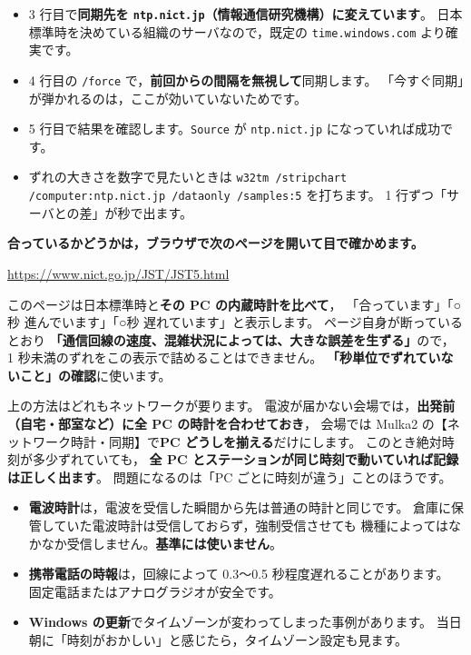 \begin{itemize}
\item 3 行目で\textbf{同期先を \texttt{ntp.nict.jp}（情報通信研究機構）に変えています}。
      日本標準時を決めている組織のサーバなので，既定の \texttt{time.windows.com} より確実です。
\item 4 行目の \texttt{/force} で，\textbf{前回からの間隔を無視して}同期します。
      「今すぐ同期」が弾かれるのは，ここが効いていないためです。
\item 5 行目で結果を確認します。\texttt{Source} が \texttt{ntp.nict.jp} になっていれば成功です。
\item ずれの大きさを数字で見たいときは
      \texttt{w32tm /stripchart /computer:ntp.nict.jp /dataonly /samples:5} を打ちます。
      1 行ずつ「サーバとの差」が秒で出ます。
\end{itemize}

\textbf{合っているかどうかは，ブラウザで次のページを開いて目で確かめます。}

\begin{center}
\small\url{https://www.nict.go.jp/JST/JST5.html}
\end{center}

このページは日本標準時と\textbf{その PC の内蔵時計を比べて}，
「合っています」「○秒 進んでいます」「○秒 遅れています」と表示します。
ページ自身が断っているとおり
\textbf{「通信回線の速度、混雑状況によっては、大きな誤差を生ずる」}ので，
1 秒未満のずれをこの表示で詰めることはできません。
\textbf{「秒単位でずれていないこと」の確認}に使います。

\begin{Note}[会場でインターネットにつながらない場合]
上の方法はどれもネットワークが要ります。
電波が届かない会場では，\textbf{出発前（自宅・部室など）に全 PC の時計を合わせておき}，
会場では Mulka2 の【ネットワーク時計・同期】で\textbf{PC どうしを揃える}だけにします。
このとき絶対時刻が多少ずれていても，
\textbf{全 PC とステーションが同じ時刻で動いていれば記録は正しく出ます}。
問題になるのは「PC ごとに時刻が違う」ことのほうです。
\end{Note}

\begin{Note}
\begin{itemize}
\item \textbf{電波時計}は，電波を受信した瞬間から先は普通の時計と同じです。
      倉庫に保管していた電波時計は受信しておらず，強制受信させても
      機種によってはなかなか受信しません。\textbf{基準には使いません}。
\item \textbf{携帯電話の時報}は，回線によって 0.3〜0.5 秒程度遅れることがあります。
      固定電話またはアナログラジオが安全です。
\item \textbf{Windows の更新}でタイムゾーンが変わってしまった事例があります。
      当日朝に「時刻がおかしい」と感じたら，タイムゾーン設定も見ます。
\end{itemize}
\end{Note}

